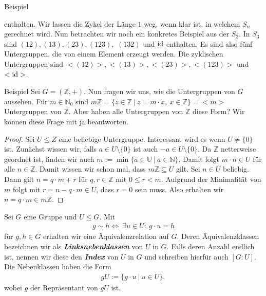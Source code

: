 \begin{genericdf}{Beispiel}
\begin{figure}[H]
\end{figure}
enthalten. Wir lassen die Zykel der Länge $1$ weg, wenn klar ist, in welchem $S_n$ gerechnet wird.
Nun betrachten wir noch ein konkretes Beispiel aus der $S_3$.
In $S_3$ sind $(1 2),(1 3), (2 3), (1 2 3),$ $(1 3 2)$ und $\operatorname{id}$ enthalten.
Es sind also fünf Untergruppen, die von einem Element erzeugt werden. Die zyklischen Untergruppen sind
$<(1 2)>, <(1 3)>, <(2 3)>, <(1 2 3)>$ und $< \operatorname{id} >$.
\end{genericdf}

\begin{genericdf}{Beispiel}\label{1.11}
Sei $G = ( \mathbb{Z}, + )$. Nun fragen wir uns, wie die Untergruppen von $G$ aussehen.
Für $m \in \mathbb{N}_0$ sind $m  \mathbb{Z} = \lbrace z \in \mathbb{Z} \ | \ z = m \cdot x, \ x \in \mathbb{Z} \rbrace = < m >$  Untergruppen von $\mathbb{Z}$.
Aber haben alle Untergruppen von $\mathbb{Z}$ diese Form? Wir können diese Frage mit ja beantworten.
\begin{proof}
Sei $U \leq Z$ eine beliebige Untergruppe. Interessant wird es wenn $U \neq \lbrace 0 \rbrace $ ist.
Zunächst wissen wir, falls $ a \in U \setminus \lbrace 0 \rbrace$ ist auch $ -a \in U \setminus \lbrace 0 \rbrace$.
Da $\mathbb{Z}$ netterweise geordnet ist, finden wir auch $m := \min \lbrace a \in \mathbb{U} \ | \ a \in \mathbb{N} \rbrace$. Damit folgt $m \cdot n \in U$ für alle $n \in \mathbb{Z}$.
Damit wissen wir schon mal, dass $m  \mathbb{Z} \subseteq U$ gilt.
Sei $n \in U$ beliebig. Dann gilt $n = q \cdot m + r$ für $q,r \in \mathbb{Z}$ mit $0 \leq r < m$.
Aufgrund der Minimalität von $m$ folgt mit $r = n -q \cdot m \in U$, dass $r = 0$ sein muss. Also erhalten wir $n = q \cdot m \in m\mathbb{Z}$.
\end{proof}

\end{genericdf}

\begin{df}\label{1.12} 
Sei $G$ eine Gruppe und $U \leq G$. Mit 
\begin{align*}
g \sim h \Leftrightarrow \ \exists u \in U: \ g \cdot u = h
\end{align*}
für $g,h \in G$ erhalten wir eine Äquivalenzrelation auf $G$.
Deren Äquivalenzklassen bezeichnen wir als \textit{\textbf{Linksnebenklassen}} von $U$ in $G$.
Falls deren Anzahl endlich ist, nennen wir diese den \textit{\textbf{Index}} von $U$ in $G$ und schreiben hierfür auch $[G:U].$
Die Nebenklassen haben die Form
\begin{align*}
gU := \lbrace g\cdot u \ | \ u \in U \rbrace,
\end{align*}
wobei $g$ der Repräsentant von $gU$ ist.
\end{df}

